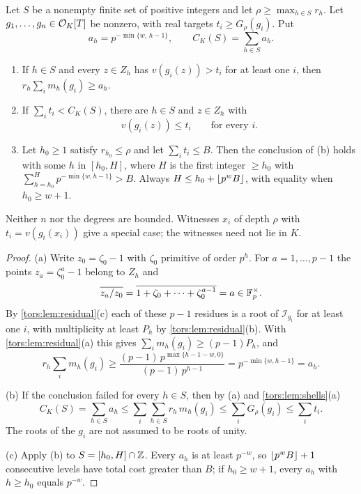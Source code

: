 \begin{theorem}\label{tors:thm:fixedfield}
Let $S$ be a nonempty finite set of positive integers and let $\rho\ge\max_{h\in S}r_h$.
Let $g_1,\dots,g_n\in\mathcal{O}_K[T]$ be nonzero, with real targets $t_i\ge G_\rho(g_i)$. Put
\[
  a_h=p^{-\min\{w,\,h-1\}},\qquad C_K(S)=\sum_{h\in S}a_h .
\]
\begin{enumerate}[label=\textup{(\alph*)}]
\item If $h\in S$ and every $z\in Z_h$ has $v(g_i(z))>t_i$ for at least one $i$, then
  $r_h\sum_im_h(g_i)\ge a_h$.
\item If $\sum_it_i<C_K(S)$, there are $h\in S$ and $z\in Z_h$ with
  \[
    v(g_i(z))\le t_i\qquad\text{for every }i .
  \]
\item Let $h_0\ge1$ satisfy $r_{h_0}\le\rho$ and let $\sum_it_i\le B$. Then the
  conclusion of \textup{(b)} holds with some $h$ in $[h_0,H]$, where $H$ is the first
  integer $\ge h_0$ with $\sum_{h=h_0}^{H}p^{-\min\{w,h-1\}}>B$. Always
  $H\le h_0+\lfloor p^wB\rfloor$, with equality when $h_0\ge w+1$.
\end{enumerate}
Neither $n$ nor the degrees are bounded. Witnesses $x_i$ of depth $\rho$ with
$t_i=v(g_i(x_i))$ give a special case; the witnesses need not lie in $K$.
\end{theorem}

\begin{proof}
(a) Write $z_0=\zeta_0-1$ with $\zeta_0$ primitive of order $p^h$. For $a=1,\dots,p-1$
the points $z_a=\zeta_0^a-1$ belong to $Z_h$ and
\[
  \overline{z_a/z_0}=\overline{1+\zeta_0+\dots+\zeta_0^{a-1}}=a\in\mathbb{F}_p^\times .
\]
By \cref{tors:lem:residual}(c) each of these $p-1$ residues is a root of
$\mathcal I_{g_i}$ for at least one $i$, with multiplicity at least $P_h$ by
\cref{tors:lem:residual}(b). With \cref{tors:lem:residual}(a) this gives
$\sum_im_h(g_i)\ge(p-1)P_h$, and
\[
  r_h\sum_im_h(g_i)\ge\frac{(p-1)\,p^{\max\{h-1-w,0\}}}{(p-1)\,p^{h-1}}
  =p^{-\min\{w,h-1\}}=a_h .
\]

(b) If the conclusion failed for every $h\in S$, then by (a) and
\cref{tors:lem:shells}(a)
\[
  C_K(S)=\sum_{h\in S}a_h\le\sum_i\sum_{h\in S}r_h\,m_h(g_i)\le\sum_iG_\rho(g_i)
  \le\sum_it_i .
\]
The roots of the $g_i$ are not assumed to be roots of unity.

(c) Apply (b) to $S=[h_0,H]\cap\mathbb{Z}$. Every $a_h$ is at least $p^{-w}$, so
$\lfloor p^wB\rfloor+1$ consecutive levels have total cost greater than $B$; if $h_0\ge w+1$,
every $a_h$ with $h\ge h_0$ equals $p^{-w}$.
\end{proof}

